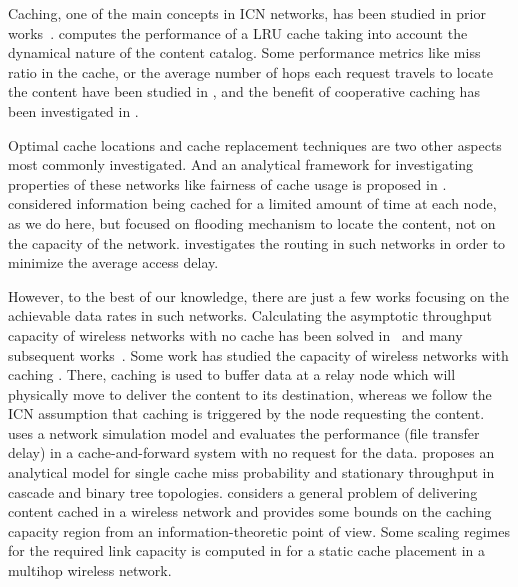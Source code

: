 \documentclass[journal]{IEEEtran}
\theoremstyle{plain}
\theoremstyle{remark}
\begin{document}
Caching, one of the main concepts in ICN networks, has been studied in prior works~\cite{Ahlgren2012Survey}. \cite{Olmos2014Catalog} computes the performance of a LRU cache taking into account the dynamical nature of the content catalog. Some performance metrics like miss ratio in the cache, or the average number of hops each request travels to locate the content have been studied in \cite{InfoCom01:Che,InfoCom10:Rosensweig}, and the benefit of cooperative caching has been investigated in \cite{Wolman1999Scale}. 

Optimal cache locations \cite{Rosensweig2009Breadcrumbs} and cache replacement techniques \cite{IEEEMob05:Yin} are two other aspects most commonly investigated. And an analytical framework for investigating properties of these networks like fairness of cache usage is proposed in \cite{Tortelli2011Fairness}. \cite{Westphal2005Maximizing} considered information being cached for a limited amount of time at each node, as we do here, but focused on flooding mechanism to locate the content, not on the capacity of the network. \cite{Dehghan2014Complexity} investigates the routing in such networks in order to minimize the average access delay.

However, to the best of our knowledge, there are just a few works focusing on the achievable data rates in such networks. Calculating the asymptotic throughput capacity of wireless networks with no cache has been solved in~\cite{Gupta2000Capacity} and many subsequent works~\cite{Li2001Capacity}\cite{Niesen2009Capacity}. Some work has studied the capacity of wireless networks with caching \cite{Grossglauser2002Mobility}\cite{Herdtner2005Throughput}\cite{AlfanoContentCentric} . There, caching is used to buffer data at a relay node which will physically move to deliver the content to its destination, whereas we follow the ICN assumption that caching is triggered by the node requesting the content. 
\cite{ICCW09:Liu} uses a network simulation model and evaluates the performance (file transfer delay) in a cache-and-forward system with no request for the data. \cite{Carofiglio2011Modeling} proposes an analytical model for single cache miss probability and stationary throughput in cascade and binary tree topologies. \cite{IEEEIT11:Niesen} considers a general problem of delivering content cached in a wireless network and provides some bounds on the caching capacity region from an information-theoretic point of view. Some scaling regimes for the required link capacity is computed in \cite{Gitzenis2013Asymptotic} for a static cache placement in a multihop wireless network. 
\end{document}
